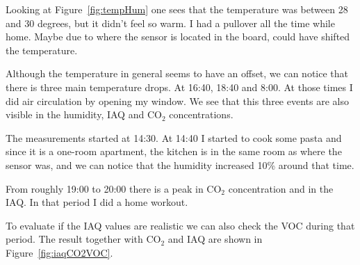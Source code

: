 \documentclass[DIV=14]{scrartcl}
\begin{document}
%
%
%

    Looking at Figure~\ref{fig:tempHum} one sees that the temperature was between 28 and 30 degrees, but it didn't feel so warm.
    I had a pullover all the time while home.
    Maybe due to where the sensor is located in the board, could have shifted the temperature.

    Although the temperature in general seems to have an offset, we can notice that there is three main temperature drops.
    At 16:40, 18:40 and 8:00.
    At those times I did air circulation by opening my window.
    We see that this three events are also visible in the humidity, IAQ and $\mathrm{CO_2}$ concentrations.

    The measurements started at 14:30.
    At 14:40 I started to cook some pasta and since it is a one-room apartment, the kitchen is in the same room as where the
    sensor was, and we can notice that the humidity increased 10\% around that time.

    From roughly 19:00 to 20:00 there is a peak in $\mathrm{CO_2}$ concentration and in the IAQ.
    In that period I did a home workout.

    To evaluate if the IAQ values are realistic we can also check the VOC during that period.
    The result together with $\mathrm{CO_2}$ and IAQ are shown in Figure~\ref{fig:iaqCO2VOC}.
\end{document}
